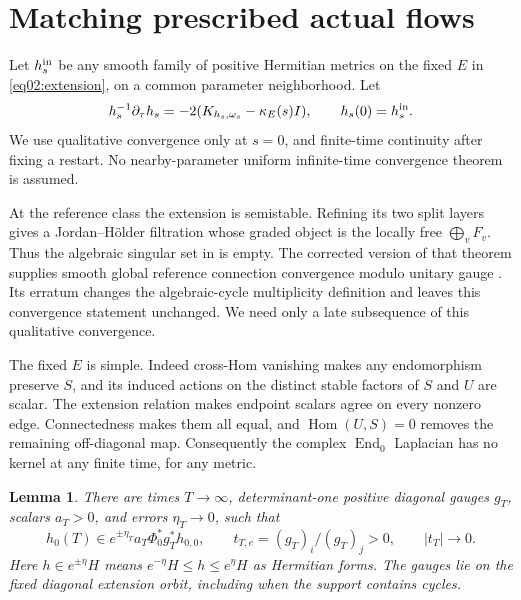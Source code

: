 \documentclass[11pt]{amsart}
\newtheorem{lemma}[theorem]{Lemma}
\theoremstyle{definition}
\theoremstyle{remark}
\newcommand{\End}{\operatorname{End}}
\newcommand{\Hom}{\operatorname{Hom}}
\begin{document}
\section{Matching prescribed actual flows}\label{sec08:matching}

Let \(h_s^{\rm in}\) be any smooth family of positive Hermitian
metrics on the fixed \(E\) in \eqref{eq02:extension}, on a common
parameter neighborhood. Let
\begin{equation}\label{eq08:actualflow}
 h_s^{-1}\partial_\tau h_s=-2(K_{h_s,\omega_s}-\kappa_E(s)I),
 \qquad h_s(0)=h_s^{\rm in}.
\end{equation}
We use qualitative convergence only at \(s=0\), and finite-time
continuity after fixing a restart. No nearby-parameter uniform
infinite-time convergence theorem is assumed.

At the reference class the extension is semistable. Refining its
two split layers gives a Jordan--H\"older filtration whose graded
object is the locally free \(\bigoplus_vF_v\). Thus the algebraic
singular set in \cite[\S2.2]{sibleywentworth2015}
is empty. The corrected version of that theorem supplies smooth
global reference connection convergence modulo unitary gauge
\cite[Theorem~1.1(2)]{sibleywentworth2015}. Its
erratum changes the algebraic-cycle multiplicity definition and
leaves this convergence statement unchanged. We need only a late
subsequence of this qualitative convergence.

The fixed \(E\) is simple. Indeed cross-Hom vanishing makes any
endomorphism preserve \(S\), and its induced actions on the distinct
stable factors of \(S\) and \(U\) are scalar. The extension relation
makes endpoint scalars agree on every nonzero edge. Connectedness
makes them all equal, and \(\Hom(U,S)=0\) removes the remaining
off-diagonal map. Consequently the complex \(\End_0\) Laplacian
has no kernel at any finite time, for any metric.

\begin{lemma}\label{lem08:matching}
There are times \(T\to\infty\), determinant-one positive diagonal
gauges \(g_T\), scalars \(a_T>0\), and errors \(\eta_T\to0\),
such that
\begin{equation}\label{eq08:matching}
 h_0(T)\in e^{\pm\eta_T}a_T\Phi_0^*g_T^*h_{0,0},\qquad
 t_{T,e}=(g_T)_i/(g_T)_j>0,\qquad |t_T|\to0.
\end{equation}
Here \(h\in e^{\pm\eta}H\) means
\(e^{-\eta}H\le h\le e^\eta H\) as Hermitian forms.
The gauges lie on the fixed diagonal extension orbit, including
when the support contains cycles.
\end{lemma}
\end{document}
